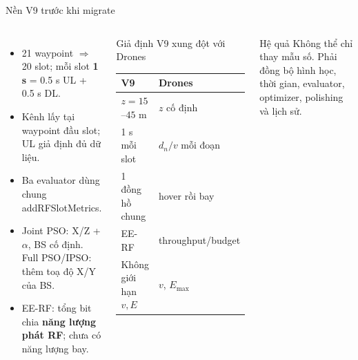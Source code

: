 \documentclass[t,aspectratio=169]{beamer}
\newcommand{\hb}[1]{{\color{hustprimary}\textbf{#1}}}
\newcommand{\code}[1]{{\small\ttfamily #1}}
\begin{document}
\begin{frame}{Nền V9 trước khi migrate}
  \begin{columns}[T]
  \small
  \begin{itemize}
    \item 21 waypoint $\Rightarrow$ 20 slot; mỗi slot \hb{1 s} = 0.5 s UL + 0.5 s DL.
    \item Kênh lấy tại waypoint đầu slot; UL giả định đủ dữ liệu.
    \item Ba evaluator dùng chung \code{addRFSlotMetrics}.
    \item Joint PSO: X/Z + $\alpha$, BS cố định. Full PSO/IPSO: thêm toạ độ X/Y của BS.
    \item EE-RF: tổng bit chia \hb{năng lượng phát RF}; chưa có năng lượng bay.
  \end{itemize}
  \begin{block}{Giả định V9 xung đột với Drones}\scriptsize
  \begin{tabular}{@{}p{3.55cm}p{2.45cm}@{}}
    \toprule
    V9 & Drones\\
    \midrule
    $z=15$--$45$ m & $z$ cố định\\
    1 s mỗi slot & $d_n/v$ mỗi đoạn\\
    1 đồng hồ chung & hover rồi bay\\
    EE-RF & throughput/budget\\
    Không giới hạn $v,E$ & $v$, $E_{\max}$\\
    \bottomrule
  \end{tabular}
  \end{block}
  \begin{alertblock}{Hệ quả}\scriptsize
  Không thể chỉ thay mẫu số. Phải đồng bộ hình học, thời gian, evaluator, optimizer, polishing và lịch sử.
  \end{alertblock}
  \end{columns}
\end{frame}
\end{document}
